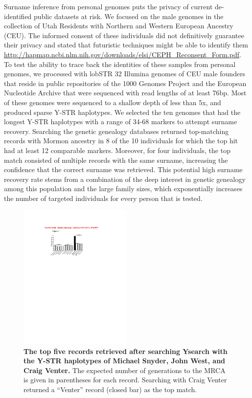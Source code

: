Surname inference from personal genomes puts the privacy of current de-identified public datasets at risk. We focused on the male genomes in the collection of Utah Residents with Northern and Western European Ancestry (CEU). The informed consent of these individuals did not definitively guarantee their privacy and stated that futuristic techniques might be able to identify them \url{http://hapmap.ncbi.nlm.nih.gov/downloads/elsi/CEPH_Reconsent_Form.pdf}. To test the ability to trace back the identities of these samples from personal genomes, we processed with lobSTR 32 Illumina genomes of CEU male founders that reside in public repositories of the 1000 Genomes Project \cite{AbecasisAltshulerAutonEtAl2010} and the European Nucleotide Archive that were sequenced with read lengths of at least 76bp. Most of these genomes were sequenced to a shallow depth of less than 5x, and produced sparse Y-STR haplotypes. We selected the ten genomes that had the longest Y-STR haplotypes with a range of 34-68 markers to attempt surname recovery. Searching the genetic genealogy databases returned top-matching records with Mormon ancestry in 8 of the 10 individuals for which the top hit had at least 12 comparable markers. Moreover, for four individuals, the top match consisted of multiple records with the same surname, increasing the confidence that the correct surname was retrieved. This potential high surname recovery rate stems from a combination of the deep interest in genetic genealogy among this population and the large family sizes, which exponentially increases the number of targeted individuals for every person that is tested. 

\begin{figure}[h!]
\centering
\label{fig:surfig2}
\includegraphics[width=0.5\textwidth]{Figures/App1/Fig2.pdf}
\caption{\textbf{The top five records retrieved after searching Ysearch with the Y-STR haplotypes of Michael Snyder, John West, and Craig Venter.} The expected number of generations to the MRCA is given in parentheses for each record. Searching with Craig Venter returned a ``Venter'' record (closed bar) as the top match.}
\end{figure}


